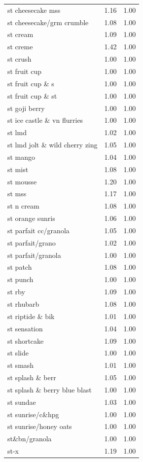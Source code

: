 \begin{table}
\begin{tabular}{lrr}
st cheesecake mss & 1.16 & 1.00 \\
st cheesecake/grm crumble & 1.08 & 1.00 \\
st cream & 1.09 & 1.00 \\
st creme & 1.42 & 1.00 \\
st crush & 1.00 & 1.00 \\
st fruit cup & 1.00 & 1.00 \\
st fruit cup \& s & 1.00 & 1.00 \\
st fruit cup \& st & 1.00 & 1.00 \\
st goji berry & 1.00 & 1.00 \\
st ice castle \& vn flurries & 1.00 & 1.00 \\
st lmd & 1.02 & 1.00 \\
st lmd jolt \& wild cherry zing & 1.05 & 1.00 \\
st mango & 1.04 & 1.00 \\
st mist & 1.08 & 1.00 \\
st mousse & 1.20 & 1.00 \\
st mss & 1.17 & 1.00 \\
st n cream & 1.08 & 1.00 \\
st orange sunris & 1.06 & 1.00 \\
st parfait cc/granola & 1.05 & 1.00 \\
st parfait/grano & 1.02 & 1.00 \\
st parfait/granola & 1.00 & 1.00 \\
st patch & 1.08 & 1.00 \\
st punch & 1.00 & 1.00 \\
st rby & 1.09 & 1.00 \\
st rhubarb & 1.08 & 1.00 \\
st riptide \& bik & 1.01 & 1.00 \\
st sensation & 1.04 & 1.00 \\
st shortcake & 1.09 & 1.00 \\
st slide & 1.00 & 1.00 \\
st smash & 1.01 & 1.00 \\
st splash \& berr & 1.05 & 1.00 \\
st splash \& berry blue blast & 1.00 & 1.00 \\
st sundae & 1.03 & 1.00 \\
st sunrise/c\&hpg & 1.00 & 1.00 \\
st sunrise/honey oats & 1.00 & 1.00 \\
st\&bn/granola & 1.00 & 1.00 \\
st-x & 1.19 & 1.00 \\

\end{tabular}
\end{table}
